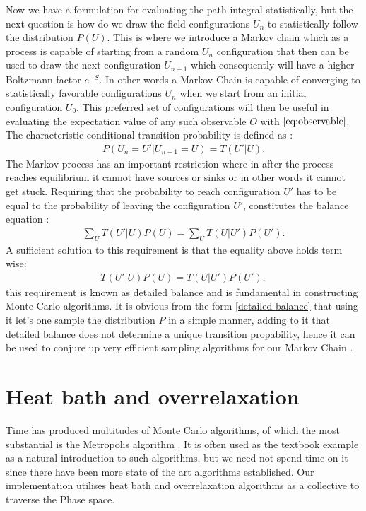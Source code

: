 \documentclass[english,twoside,openright]{UH_TCM_MSc}
\begin{document}
Now we have a formulation for evaluating the path integral statistically, but the next question is how do we draw the field configurations $U_n$ to statistically follow the distribution $P(U)$. This is where we introduce a Markov chain which as a process is capable of starting from a random $U_n$ configuration that then can be used to  draw the next configuration $U_{n+1}$ which consequently will have a higher Boltzmann factor $e^{-S}$. In other words a Markov Chain is capable of converging to statistically favorable configurations $U_n$ when we start from an initial configuration $U_0$. This preferred set of configurations will then be useful in evaluating the expectation value of any such observable $O$ with $\ref{eq:observable}$. The characteristic conditional transition probability is defined as \cite[ch. 9]{clarke1991probability}:
\begin{align}
    P(U_n = U' | U_{n-1} = U) = T(U'|U).
\end{align}
The Markov process has an important restriction where in after the process reaches equilibrium it cannot have sources or sinks or in other words it cannot get stuck. Requiring that the probability to reach configuration $U'$ has to be equal to the probability of leaving the configuration $U'$, constitutes the balance equation \cite[ch. 4.1.2]{gattringer2009quantum}:
\begin{align*}
    \sum_{U}T(U'|U)P(U) = \sum_{U}T(U|U')P(U'). \label{detailed balance}
\end{align*}
A sufficient solution to this requirement is that the equality above holds term wise:
\begin{align}
    T(U'|U)P(U) = T(U|U')P(U'),
\end{align}
this requirement is known as detailed balance \cite{berg2004introduction,Norris_1997} and is fundamental in constructing Monte Carlo algorithms. It is obvious from the form \ref{detailed balance} that using it let's one sample the distribution $P$ in a simple manner, adding to it that detailed balance does not determine a unique transition propability, hence it can be used to conjure up very efficient sampling algorithms for our Markov Chain \cite[ch. 16]{Rothe:1992nt}.


\section{Heat bath and overrelaxation}

Time has produced multitudes of Monte Carlo algorithms, of which the most substantial is the Metropolis algorithm \cite{metropolis}. It is often used as the textbook example as a natural introduction to such algorithms, but we need not spend time on it since there have been more state of the art algorithms established. Our implementation utilises heat bath \cite{Creutz_SU2,Creutz:1983njd} and overrelaxation \cite{Adler,Whitmer} algorithms as a collective to traverse the Phase space.
\end{document}
